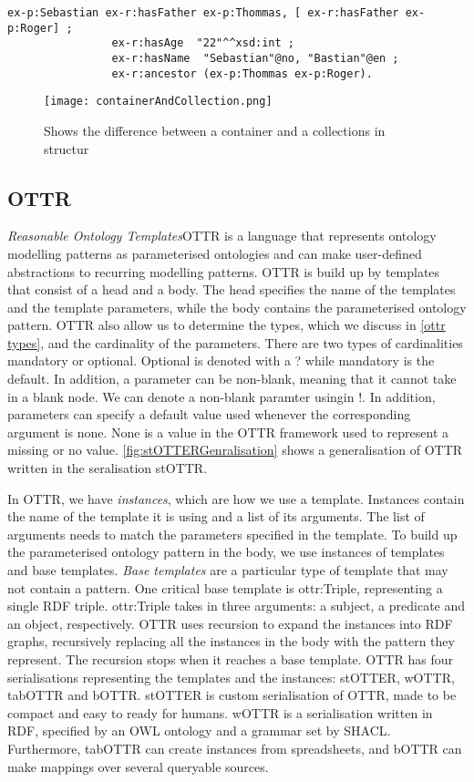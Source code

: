 \begin{lstlisting}[frame=single, language=turtle]
ex-p:Sebastian ex-r:hasFather ex-p:Thommas, [ ex-r:hasFather ex-p:Roger] ; 
                ex-r:hasAge  "22"^^xsd:int ; 
                ex-r:hasName  "Sebastian"@no, "Bastian"@en ;
                ex-r:ancestor (ex-p:Thommas ex-p:Roger).
\end{lstlisting}

\begin{figure}
    \centering
    \texttt{[image: containerAndCollection.png]}
    \caption{Shows the difference between a container and a collections in structur}
    \label{fig:containerAndCollection}
\end{figure}

\subsection{OTTR}
\emph{Reasonable Ontology Templates}OTTR is a language that represents ontology modelling patterns as parameterised ontologies and can make user-defined abstractions to recurring modelling patterns. OTTR is build up by templates that consist of a head and a body. The head specifies the name of the templates and the template parameters, while the body contains the parameterised ontology pattern. OTTR also allow us to determine the types, which we discuss in \autoref{ottr types}, and the cardinality of the parameters. There are two types of cardinalities mandatory or optional. Optional is denoted with a ? while mandatory is the default. In addition, a parameter can be non-blank, meaning that it cannot take in a blank node. We can denote a non-blank paramter usingin !. In addition, parameters can specify a default value used whenever the corresponding argument is none. None is a value in the OTTR framework used to represent a missing or no value. \autoref{fig:stOTTERGenralisation} shows a generalisation of OTTR written in the seralisation stOTTR.

\para
In OTTR, we have \emph{instances}, which are how we use a template. Instances contain the name of the template it is using and a list of its arguments. The list of arguments needs to match the parameters specified in the template. To build up the parameterised ontology pattern in the body, we use instances of templates and base templates. \emph{Base templates} are a particular type of template that may not contain a pattern. One critical base template is ottr:Triple, representing a single RDF triple. ottr:Triple takes in three arguments: a subject, a predicate and an object, respectively. OTTR uses recursion to expand the instances into RDF graphs, recursively replacing all the instances in the body with the pattern they represent. The recursion stops when it reaches a base template. OTTR has four serialisations representing the templates and the instances: stOTTER, wOTTR, tabOTTR and bOTTR. stOTTER is custom serialisation of OTTR, made to be compact and easy to ready for humans. wOTTR is a serialisation written in RDF, specified by an OWL ontology and a grammar set by SHACL. Furthermore, tabOTTR can create instances from spreadsheets, and bOTTR can make mappings over several queryable sources. 

